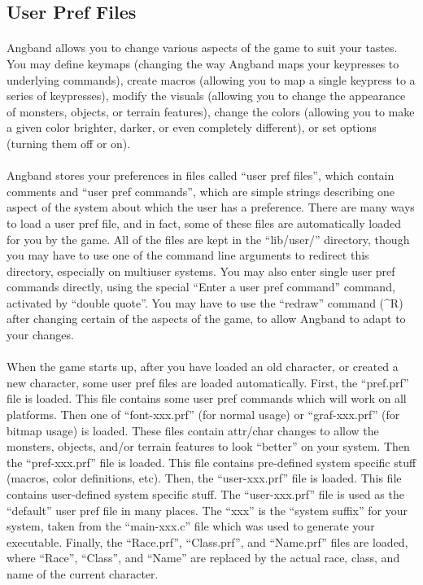 \subsection{User Pref Files}
\paragraph{}Angband allows you to change various aspects of the game to suit
your tastes. You may define keymaps (changing the way Angband maps your
keypresses to underlying commands), create macros (allowing you to map a
single keypress to a series of keypresses), modify the visuals (allowing
you to change the appearance of monsters, objects, or terrain features),
change the colors (allowing you to make a given color brighter, darker,
or even completely different), or set options (turning them off or on).

\paragraph{}Angband stores your preferences in files called ``user pref
files'', which contain comments and ``user pref commands'', which are
simple strings describing one aspect of the system about which the user
has a preference.  There are many ways to load a user pref file, and in
fact, some of these files are automatically loaded for you by the game.
All of the files are kept in the ``lib/user/'' directory, though you may
have to use one of the command line arguments to redirect this
directory, especially on multiuser systems. You may also enter single
user pref commands directly, using the special ``Enter a user pref
command'' command, activated by ``double quote''.  You may have to use
the ``redraw'' command (\^{}R) after changing certain of the aspects of
the game, to allow Angband to adapt to your changes.

\paragraph{}When the game starts up, after you have loaded an old character,
or created a new character, some user pref files are loaded automatically.
First, the ``pref.prf'' file is loaded. This file contains some user pref
commands which will work on all platforms. Then one of ``font-xxx.prf''
(for normal usage) or ``graf-xxx.prf'' (for bitmap usage) is loaded. These
files contain attr/char changes to allow the monsters, objects, and/or
terrain features to look ``better'' on your system. Then the
``pref-xxx.prf''
file is loaded. This file contains pre-defined system specific stuff
(macros, color definitions, etc). Then, the ``user-xxx.prf'' file is loaded.
This file contains user-defined system specific stuff. The
``user-xxx.prf''
file is used as the ``default'' user pref file in many places. The
``xxx'' is
the ``system suffix'' for your system, taken from the ``main-xxx.c'' file which
was used to generate your executable. Finally, the ``Race.prf'',
``Class.prf'',
and ``Name.prf'' files are loaded, where ``Race'', ``Class'', and
``Name'' are
replaced by the actual race, class, and name of the current character.

